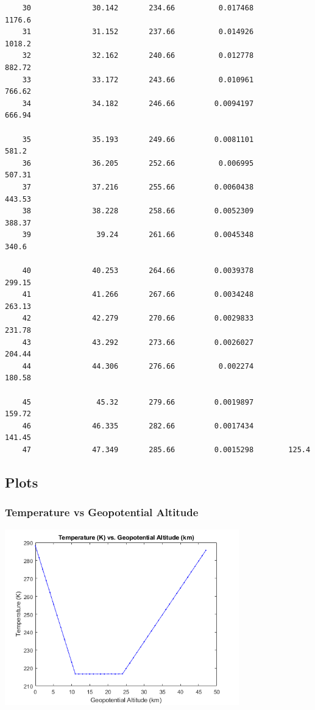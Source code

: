 \documentclass{article}
\begin{document}
\begin{verbatim}
    30              30.142       234.66          0.017468        1176.6
    31              31.152       237.66          0.014926        1018.2
    32              32.162       240.66          0.012778        882.72
    33              33.172       243.66          0.010961        766.62
    34              34.182       246.66         0.0094197        666.94
    
    35              35.193       249.66         0.0081101         581.2
    36              36.205       252.66          0.006995        507.31
    37              37.216       255.66         0.0060438        443.53
    38              38.228       258.66         0.0052309        388.37
    39               39.24       261.66         0.0045348         340.6
    
    40              40.253       264.66         0.0039378        299.15
    41              41.266       267.66         0.0034248        263.13
    42              42.279       270.66         0.0029833        231.78
    43              43.292       273.66         0.0026027        204.44
    44              44.306       276.66          0.002274        180.58
    
    45               45.32       279.66         0.0019897        159.72
    46              46.335       282.66         0.0017434        141.45
    47              47.349       285.66         0.0015298        125.4
\end{verbatim} \color{black}
\subsection{Plots}
\subsubsection{Temperature vs Geopotential Altitude}
\includegraphics [height=3in]{graph1.png}
\end{document}

